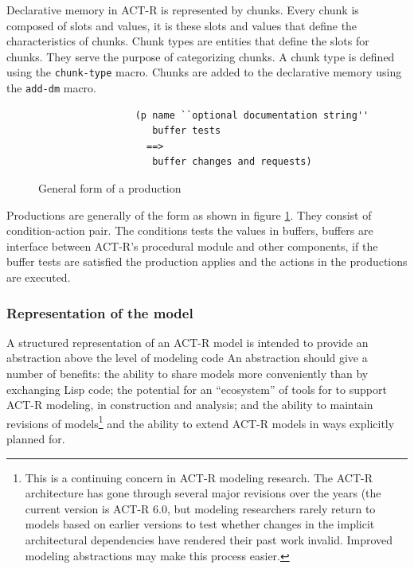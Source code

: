 Declarative memory in ACT-R is represented by
chunks\cite{actr-tut}. Every chunk is composed of slots and values, it
is these slots and values that define the characteristics of
chunks. Chunk types are entities that define the slots for
chunks. They serve the purpose of categorizing
chunks\cite{actr-tut}. A chunk type is defined using the
\texttt{chunk-type} macro. Chunks are added to the declarative memory
using the \texttt{add-dm} macro. 

\begin{figure}
\label{production_fig}
\centering
\begin{center}
\begin{verbatim}
                 (p name ``optional documentation string''
                    buffer tests
                   ==>
                    buffer changes and requests)
\end{verbatim}
\end{center}
\caption{General form of a production\cite{actr-tut}}
\end{figure}

Productions are generally of the form as shown in figure
\ref{production_fig}. They consist of condition-action pair. The
conditions tests the values in buffers, buffers are interface between
ACT-R's procedural module and other components, if the buffer tests
are satisfied the production applies and the actions in the
productions are executed. 

\subsubsection{Representation of the model}
A structured representation of an ACT-R model is intended to provide
an abstraction above the level of modeling code An abstraction should
give a number of benefits: the ability to share models more
conveniently than by exchanging Lisp code; the potential for an
``ecosystem'' of tools for to support ACT-R modeling, in construction
and analysis; and the ability to maintain revisions of
models\footnote{This is a continuing concern in ACT-R modeling
  research.  The ACT-R architecture has gone through several major
  revisions over the years (the current version is ACT-R 6.0, but
  modeling researchers rarely return to models based on earlier
  versions to test whether changes in the implicit architectural
  dependencies have rendered their past work invalid.  Improved
  modeling abstractions may make this process easier.}
%
and the ability to extend ACT-R models in ways explicitly planned for.

